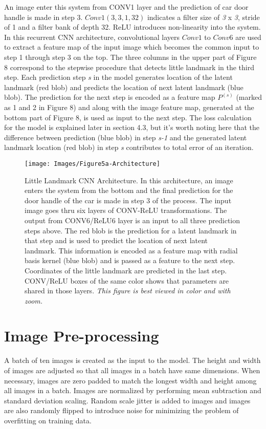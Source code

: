 \documentclass [11pt,letterpaper ,twoside ,openany ]{report}
\begin{document}
    An image enter this system from CONV1 layer and the prediction of car door handle is made in step 3. \(Conv1(3,3,1,32) \) indicates a filter size of \textit{3} x \textit{3}, stride of 1 and a filter bank of depth 32. ReLU introduces non-linearity into the system. In this recurrent CNN architecture, convolutional layers \(Conv1\) to \(Conv6\) are used to extract a feature map of the input image which becomes the common input to step 1 through step 3 on the top. The three columns in the upper part of Figure 8 correspond to the stepwise procedure that detects little landmark in the third step. Each prediction step \textit{s} in the model generates location of the latent landmark (red blob) and predicts the location of next latent landmark (blue blob). The prediction for the next step is encoded as a feature map \(P^{(s)}\) (marked as 1 and 2 in Figure 8) and along with the image feature map, generated at the bottom part of Figure 8, is used as input to the next step. The loss calculation for the model is explained later in section 4.3, but it's worth noting here that the difference between prediction (blue blob) in step \textit {s-1} and the generated latent landmark location (red blob) in step \textit {s} contributes to total error of an iteration.

    \begin{figure}[h!]
      \centering
      \texttt{[image: Images/Figure5a-Architecture]}
      \caption{Little Landmark CNN Architecture. In this architecture, an image enters the system from the bottom and the final prediction for the door handle of the car is made in step 3 of the process. The input image goes thru six layers of CONV-ReLU transformations. The output from CONV6/ReLU6 layer is an input to all three prediction steps above. The red blob is the prediction for a latent landmark in that step and is used to predict the location of next latent landmark. This information is encoded as a feature map with radial basis kernel (blue blob) and is passed as a feature to the next step. Coordinates of the little landmark are predicted in the last step. CONV/ReLU boxes of the same color shows that parameters are shared in those layers. \textit{This figure is best viewed in color and with zoom.}}
      \label{fig:arch}
    \end{figure}            

    \section{Image Pre-processing}
    A batch of ten images is created as the input to the model. The height and width of images are adjusted so that all images in a batch have same dimensions. When necessary, images are zero padded to match the longest width and height among all images in a batch. Images are normalized by performing mean subtraction and standard deviation scaling. Random scale jitter is added to images and images are also randomly flipped to introduce noise for minimizing the problem of overfitting on training data.
\end{document}
